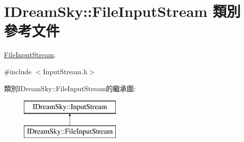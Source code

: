 \hypertarget{class_i_dream_sky_1_1_file_input_stream}{}\section{I\+Dream\+Sky\+:\+:File\+Input\+Stream 類別 參考文件}
\label{class_i_dream_sky_1_1_file_input_stream}


\hyperlink{class_i_dream_sky_1_1_file_input_stream}{File\+Input\+Stream}.  




{\ttfamily \#include $<$Input\+Stream.\+h$>$}

類別\+I\+Dream\+Sky\+:\+:File\+Input\+Stream的繼承圖\+:\begin{figure}[H]
\begin{center}
\leavevmode
\includegraphics[height=2.000000cm]{class_i_dream_sky_1_1_file_input_stream}
\end{center}
\end{figure}
